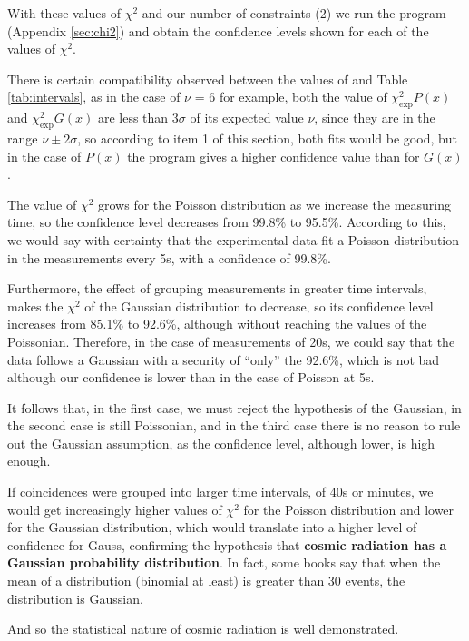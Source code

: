 With these values of $\chi^2$ and our number of constraints (2) we run the program  (Appendix \ref{sec:chi2}) and obtain the confidence levels shown for each of the values of $\chi^2$.

There is certain compatibility observed between the values of  and Table \ref{tab:intervals}, as in the case of $\nu$ = 6 for example, both the value of $\chi_\text{exp}^2 P(x)$ and $\chi_\text{exp}^2 G(x)$ are less than 3$\sigma$ of its expected value $\nu$, since they are in the range $\nu \pm 2\sigma$, so according to item 1 of this section, both fits would be good, but in the case of $P(x)$ the program gives a higher confidence value than for $G(x)$.

The value of $\chi^2$ grows for the Poisson distribution as we increase the measuring time, so the confidence level decreases from 99.8\% to 95.5\%. According to this, we would say with certainty that the experimental data fit a Poisson distribution in the measurements every 5s, with a confidence of 99.8\%.

Furthermore, the effect of grouping measurements in greater time intervals, makes the $\chi^2$ of the Gaussian distribution to decrease, so its confidence level increases from 85.1\% to 92.6\%, although without reaching the values of the Poissonian. Therefore, in the case of measurements of 20s, we could say that the data follows a Gaussian with a security of \enquote{only} the 92.6\%, which is not bad although our confidence is lower than in the case of Poisson at 5s.

It follows that, in the first case, we must reject the hypothesis of the Gaussian, in the second case is still Poissonian, and in the third case there is no reason to rule out the Gaussian assumption, as the confidence level, although lower, is high enough.


If coincidences were grouped into larger time intervals, of 40s or minutes, we would get increasingly higher values of $\chi^2$ for the Poisson distribution and lower for the Gaussian distribution, which would translate into a higher level of confidence for Gauss, confirming the hypothesis that \textbf{cosmic radiation has a Gaussian probability distribution}. In fact, some books \cite{kno:79} say that when the mean of a distribution (binomial at least) is greater than 30 events, the distribution is Gaussian.

And so the statistical nature of cosmic radiation is well demonstrated.



